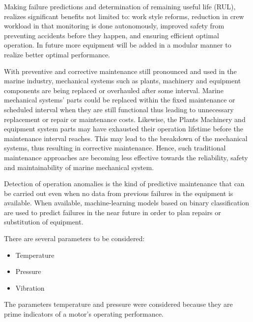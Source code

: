  Making failure predictions and determination of remaining useful life (RUL), realizes significant benefits not limited to: work style reforms, reduction in crew workload in that monitoring is done autonomously, improved safety from preventing accidents before they happen, and ensuring efficient optimal operation. In future more equipment will be added in a modular manner to realize better optimal performance.  

With preventive and corrective maintenance still pronounced and used in the marine industry, mechanical systems such as plants, machinery and equipment components are being replaced or overhauled after some interval. Marine mechanical systems’ parts could be replaced within the fixed maintenance or scheduled interval when they are still functional thus leading to unnecessary replacement or repair or maintenance costs. Likewise, the Plants Machinery and equipment system parts may have exhausted their operation lifetime before the maintenance interval reaches. This may lead to the breakdown of the mechanical systems, thus resulting in corrective maintenance. Hence, such traditional maintenance approaches are becoming less effective towards the reliability, safety and maintainability of marine mechanical system.

Detection of operation anomalies is the kind of predictive maintenance that can be carried out even when no data from previous failures in the equipment is available. When available, machine-learning models based on binary classification are used to predict failures in the near future in order to plan repairs or substitution of equipment\cite{han_motor_2019}.

There are several parameters to be considered:
\begin{itemize}
	\item Temperature 
	\item Pressure
	\item Vibration
\end{itemize} 






The parameters temperature and pressure were considered because they are prime indicators of a motor’s operating performance. 


